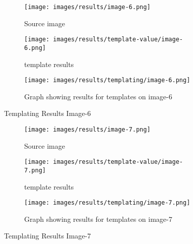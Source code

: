 \begin{figure}[H]
    \centering
    
    \begin{subfigure}{0.5\textwidth}
        \centering
        \texttt{[image: images/results/image-6.png]}
        \caption{Source image}
    \end{subfigure}%
    \begin{subfigure}{0.5\textwidth}
        \centering
        \texttt{[image: images/results/template-value/image-6.png]}
        \caption{template results}
    \end{subfigure}
    \begin{subfigure}{\textwidth}
    \centering
        \texttt{[image: images/results/templating/image-6.png]}
        \caption{Graph showing results for templates on image-6}
    \end{subfigure}
    
    \caption{Templating Results Image-6}
    \label{fig:Templating-Results-Image-6}
\end{figure}

\begin{figure}[H]
    \centering
    
    \begin{subfigure}{0.5\textwidth}
        \centering
        \texttt{[image: images/results/image-7.png]}
        \caption{Source image}
    \end{subfigure}%
    \begin{subfigure}{0.5\textwidth}
        \centering
        \texttt{[image: images/results/template-value/image-7.png]}
        \caption{template results}
    \end{subfigure}
    \begin{subfigure}{\textwidth}
    \centering
        \texttt{[image: images/results/templating/image-7.png]}
        \caption{Graph showing results for templates on image-7}
    \end{subfigure}
    
    \caption{Templating Results Image-7}
    \label{fig:Templating-Results-Image-7}
\end{figure}

